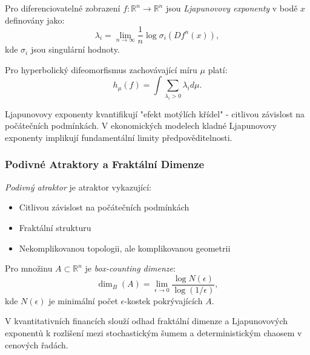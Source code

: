 \begin{definition}
Pro diferenciovatelné zobrazení $f: \mathbb{R}^n \to \mathbb{R}^n$ jsou \emph{Ljapunovovy exponenty} v bodě $x$ definovány jako:
\[
\lambda_i = \lim_{n \to \infty} \frac{1}{n} \log \sigma_i(Df^n(x)),
\]
kde $\sigma_i$ jsou singulární hodnoty.
\end{definition}

\begin{theorem}
Pro hyperbolický difeomorfismus zachovávající míru $\mu$ platí:
\[
h_\mu(f) = \int \sum_{\lambda_i > 0} \lambda_i d\mu.
\]
\end{theorem}

\begin{application}
Ljapunovovy exponenty kvantifikují "efekt motýlích křídel" - citlivou závislost na počátečních podmínkách. V ekonomických modelech kladné Ljapunovovy exponenty implikují fundamentální limity předpověditelnosti.
\end{application}

\subsubsection{Podivné Atraktory a Fraktální Dimenze}

\begin{definition}
\emph{Podivný atraktor} je atraktor vykazující:
\begin{itemize}
\item Citlivou závislost na počátečních podmínkách
\item Fraktální strukturu
\item Nekomplikovanou topologii, ale komplikovanou geometrii
\end{itemize}
\end{definition}

\begin{definition}
Pro množinu $A \subset \mathbb{R}^n$ je \emph{box-counting dimenze}:
\[
\dim_B(A) = \lim_{\epsilon \to 0} \frac{\log N(\epsilon)}{\log(1/\epsilon)},
\]
kde $N(\epsilon)$ je minimální počet $\epsilon$-kostek pokrývajících $A$.
\end{definition}

\begin{application}
V kvantitativních financích slouží odhad fraktální dimenze a Ljapunovových exponentů k rozlišení mezi stochastickým šumem a deterministickým chaosem v cenových řadách.
\end{application}

